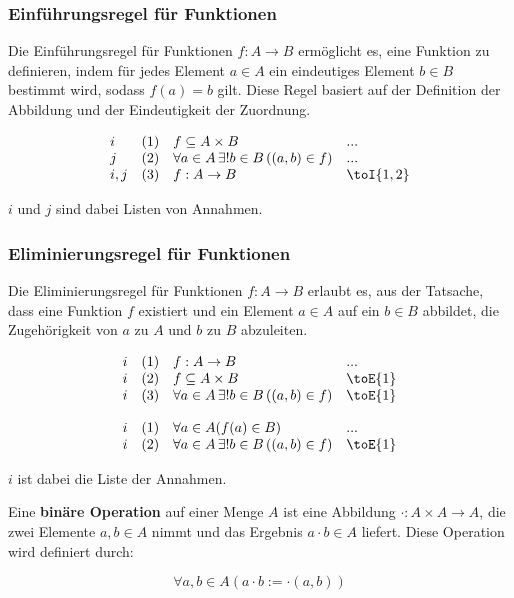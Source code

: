 \documentclass[main.tex]{subfiles}
\begin{document}
\subsubsection*{Einführungsregel für Funktionen}
\label{rule:toI}
Die Einführungsregel für Funktionen \( f: A \to B \) ermöglicht es, eine Funktion zu definieren, indem für jedes Element \( a \in A \) ein eindeutiges Element \( b \in B \) bestimmt wird, sodass \( f(a) = b \) gilt. Diese Regel basiert auf der Definition der Abbildung und der Eindeutigkeit der Zuordnung.

\[
\begin{array}{llll}
    i       & (1) & f\subseteq A\times B & ... \\
    j       & (2) & \forall a \in A \, \exists! b \in B \, ((a, b) \in f) & ... \\
    i,j     & (3) & f:A\rightarrow B & \toI{1,2}
\end{array}
\]

\(i\) und \(j\) sind dabei Listen von Annahmen.

\subsubsection*{Eliminierungsregel für Funktionen}
\label{rule:toE}
Die Eliminierungsregel für Funktionen \( f: A \to B \) erlaubt es, aus der Tatsache, dass eine Funktion \( f \) existiert und ein Element \( a \in A \) auf ein \( b \in B \) abbildet, die Zugehörigkeit von \( a \) zu \( A \) und \( b \) zu \( B \) abzuleiten.

\[
\begin{array}{llll}
    i       & (1) & f:A\rightarrow B & ... \\
    i       & (2) & f\subseteq A\times B & \toE{1} \\
    i       & (3) & \forall a \in A \, \exists! b \in B \, ((a, b) \in f) & \toE{1} \\
\end{array}
\]

\[
\begin{array}{llll}
    i       & (1) & \forall a\in A(f(a)\in B) & ... \\
    i       & (2) & \forall a \in A \, \exists! b \in B \, ((a, b) \in f) & \toE{1} \\
\end{array}
\]

\(i\) ist dabei die Liste der Annahmen.

\begin{definition}
    Eine \textbf{binäre Operation} auf einer Menge \( A \) ist eine Abbildung \( \cdot : A \times A \to A \), die zwei Elemente \( a, b \in A \) nimmt und das Ergebnis \( a \cdot b \in A \) liefert. Diese Operation wird definiert durch:
    
    \[
    \forall a,b\in A(a \cdot b := \cdot(a, b)) 
    \]
\end{definition}
\end{document}
